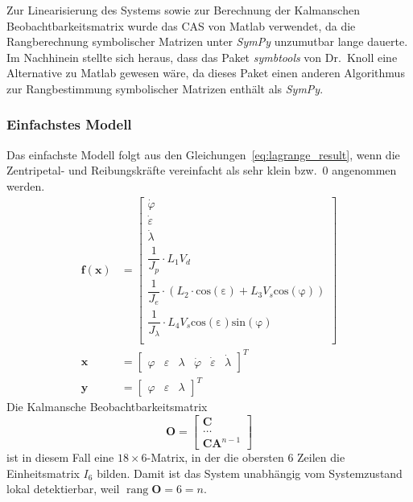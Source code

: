 \documentclass[10pt,twocolumn]{article}
\DeclareMathOperator{\rang}{rang}
\begin{document}
	Zur Linearisierung des Systems sowie zur Berechnung der Kalmanschen Beobachtbarkeitsmatrix wurde das CAS von Matlab verwendet, da die Rangberechnung symbolischer Matrizen unter \textit{SymPy} unzumutbar lange dauerte. Im Nachhinein stellte sich heraus, dass das Paket \textit{symbtools} von Dr.\ Knoll eine Alternative zu Matlab gewesen wäre, da dieses Paket einen anderen Algorithmus zur Rangbestimmung symbolischer Matrizen enth\"alt als \textit{SymPy}.

	\subsubsection{Einfachstes Modell}
	Das einfachste Modell folgt aus den Gleichungen~\ref{eq:lagrange_result}, wenn die Zentripetal- und Reibungskräfte vereinfacht als sehr klein bzw.\ 0 angenommen werden.
	\begin{align*}
	\bm f(\bm x) &= \begin{bmatrix}
	\dot \varphi \\
	\dot \varepsilon \\
	\dot \lambda  \\
	\dfrac{1}{J_p} \cdot L_1 V_d \\
	\dfrac{1}{J_e} \cdot (L_2 \cdot \mathrm{cos(\varepsilon)} + L_3 V_s \mathrm{cos(\varphi)}) \\
	\dfrac{1}{J_{\lambda}} \cdot L_4 V_s \mathrm{cos(\varepsilon)} \mathrm{sin(\varphi)} \\
	\end{bmatrix}\\
	\bm x &= \begin{bmatrix}
	\varphi & \varepsilon & \lambda & \dot \varphi & \dot \varepsilon & \dot \lambda 
	\end{bmatrix}^T \\
	\bm y &= \begin{bmatrix}
	\varphi & \varepsilon & \lambda 
	\end{bmatrix}^T
	\end{align*}
	Die Kalmansche Beobachtbarkeitsmatrix
	$$\bm O = \begin{bmatrix}
	\bm C \\
	\ldots \\
	\bm C \bm A^{n-1}
	\end{bmatrix}$$
	ist in diesem Fall eine $18\times 6$-Matrix, in der die obersten 6 Zeilen die Einheitsmatrix $I_6$ bilden.
	Damit ist das System unabhängig vom Systemzustand lokal detektierbar, weil $\rang \bm O = 6 = n$.
\end{document}
